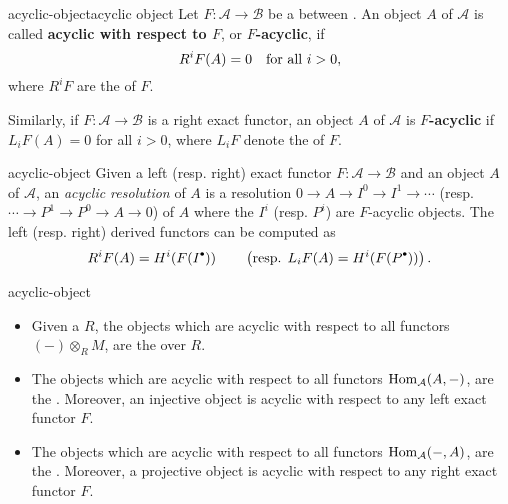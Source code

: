 \begin{topic}{acyclic-object}{acyclic object}
    Let $F \colon \mathcal{A} \to \mathcal{B}$ be a  between . An object $A$ of $\mathcal{A}$ is called \textbf{acyclic with respect to $F$}, or \textbf{$F$-acyclic}, if
    \[ R^i F(A) = 0 \quad \textup{for all } i > 0, \]
    where $R^i F$ are the  of $F$.
    
    Similarly, if $F \colon \mathcal{A} \to \mathcal{B}$ is a right exact functor, an object $A$ of $\mathcal{A}$ is \textbf{$F$-acyclic} if $L_i F(A) = 0$ for all $i > 0$, where $L_i F$ denote the  of $F$.
\end{topic}

\begin{example}{acyclic-object}
    Given a left (resp. right) exact functor $F \colon \mathcal{A} \to \mathcal{B}$ and an object $A$ of $\mathcal{A}$, an \textit{acyclic resolution} of $A$ is a resolution $0 \to A \to I^0 \to I^1 \to \cdots$ (resp. $\cdots \to P^1 \to P^0 \to A \to 0$) of $A$ where the $I^i$ (resp. $P^i$) are $F$-acyclic objects. The left (resp. right) derived functors can be computed as
    \[ R^i F(A) = H^i(F(I^\bdot)) \qquad \left(\textup{resp. } L_i F(A) = H^i(F(P^\bdot)) \right) . \]
\end{example}

\begin{example}{acyclic-object}
    \begin{itemize}
        \item Given a  $R$, the objects which are acyclic with respect to all functors $(-) \otimes_R M$, are the  over $R$.
        \item The objects which are acyclic with respect to all functors $\operatorname{Hom}_\mathcal{A}(A, -)$, are the . Moreover, an injective object is acyclic with respect to any left exact functor $F$.
        \item The objects which are acyclic with respect to all functors $\operatorname{Hom}_\mathcal{A}(-, A)$, are the . Moreover, a projective object is acyclic with respect to any right exact functor $F$.
    \end{itemize}
\end{example}

